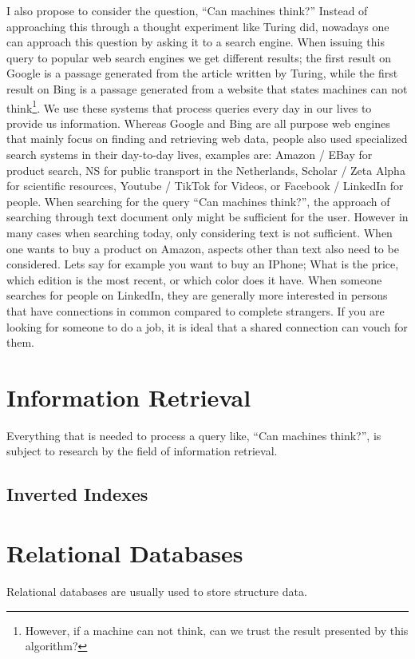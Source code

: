 \documentclass{tufte-book} %
\begin{document}
I also propose to consider the question, ``Can machines think?'' Instead of approaching this through a thought experiment like Turing\cite{Turing-Think} did, nowadays one can approach this question by asking it to a search engine. When issuing this query to popular web search engines we get different results; the first result on Google is a passage generated from the article written by Turing, while the first result on Bing is a passage generated from a website that states machines can not think\footnote{However, if a machine can not think, can we trust the result presented by this algorithm?}.
We use these systems that process queries every day in our lives to provide us information. Whereas Google and Bing are all purpose web engines that mainly focus on finding and retrieving web data, people also used specialized search systems in their day-to-day lives, examples are: Amazon / EBay for product search, NS for public transport in the Netherlands, Scholar / Zeta Alpha for scientific resources, Youtube / TikTok for Videos, or Facebook / LinkedIn for people.
When searching for the query ``Can machines think?'', the approach of searching through text document only might be sufficient for the user. However in many cases when searching today, only considering text is not sufficient. When one wants to buy a product on Amazon, aspects other than text also need to be considered. Lets say for example you want to buy an IPhone; What is the price, which edition is the most recent, or which color does it have. When someone searches for people on LinkedIn, they are generally more interested in persons that have connections in common compared to complete strangers. If you are looking for someone to do a job, it is ideal that a shared connection can vouch for them. 

\section{Information Retrieval}
Everything that is needed to process a query like, ``Can machines think?'', is subject to research by the field of information retrieval. 

\subsection{Inverted Indexes}

\section{Relational Databases}
Relational databases are usually used to store structure data. 
\end{document}
